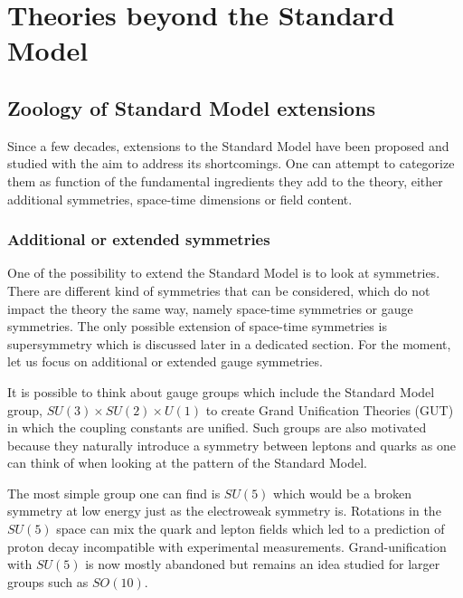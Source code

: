     \section{Theories beyond the Standard Model \label{sec:beyondTheStandardModel}}

    \subsection{Zoology of Standard Model extensions}

    Since a few decades, extensions to the Standard Model have been proposed and
    studied with the aim to address its shortcomings. One can attempt to categorize
    them as function of the fundamental ingredients they add to the theory, either
    additional symmetries, space-time dimensions or field content.

    \subsubsection{Additional or extended symmetries}

    One of the possibility to extend the Standard Model is to look at symmetries.
    There are different kind of symmetries that can be considered, which do not impact the theory
    the same way, namely space-time symmetries or gauge symmetries. The only possible
    extension of space-time symmetries is supersymmetry which is discussed later
    in a dedicated section. For the moment, let us focus on additional or extended gauge
    symmetries.

    It is possible to think about gauge groups which include the Standard Model group,
    $SU(3) \times SU(2) \times U(1)$ to create Grand Unification Theories (GUT) in which
    the coupling constants are unified. Such groups are also motivated because they
    naturally introduce a symmetry between leptons and quarks as one can think of
    when looking at the pattern of the Standard Model.

    The most simple group one can find is $SU(5)$ \cite{SU5GUT} which would be a broken symmetry at
    low energy just as the electroweak symmetry is. Rotations in the $SU(5)$ space
    can mix the quark and lepton fields which led to a prediction of proton decay
    incompatible with experimental measurements. Grand-unification with $SU(5)$ is
    now mostly abandoned but remains an idea studied for larger groups such as $SO(10)$.

